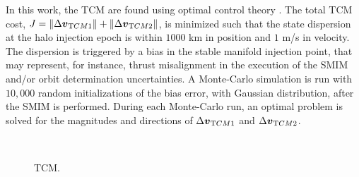 In this work, the {TCM} are found using optimal control theory \cite{serban2002haloTCM}. The total {TCM} cost, $J = \|\Delta\boldsymbol{v}_{\textrm TCM1}\|+\|\Delta\boldsymbol{v}_{\textrm TCM2}\|$, is minimized such that the state dispersion at the halo injection epoch is within $1000$ km in position and $1$ m/s in velocity. The dispersion is triggered by a bias in the stable manifold injection point, that may represent, for instance, thrust misalignment in the execution of the {SMIM} and/or orbit determination uncertainties. A Monte-Carlo simulation is run with $10,000$ random initializations of the bias error, with Gaussian distribution, after the {SMIM} is performed. During each Monte-Carlo run, an optimal problem is solved for the magnitudes and directions of $\Delta\boldsymbol{v}_{\textrm TCM1}$ and $\Delta\boldsymbol{v}_{\textrm TCM2}$.
%
\begin{figure*}[b!]
	\centering
	\hfill
	\hfill
	\hfill
	\hfill
	\hfill \\
	\hfill
	\hfill
	\hfill
	\caption[Trajectory correction maneuvers.]{{TCM}.}
	\label{fig:TCMsData}
\end{figure*}
%

